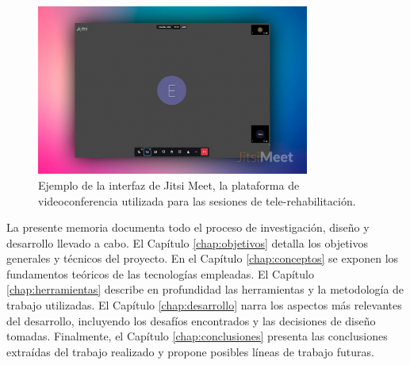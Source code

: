 \begin{figure}[H]
    \centering
    \includegraphics[width=0.8\textwidth]{img/interfazjitsi.jpg}
    \caption{Ejemplo de la interfaz de Jitsi Meet, la plataforma de videoconferencia utilizada para las sesiones de tele-rehabilitación.}
    \label{fig:interfaz_jitsi}
\end{figure}

La presente memoria documenta todo el proceso de investigación, diseño y desarrollo llevado a cabo. El Capítulo \ref{chap:objetivos} detalla los objetivos generales y técnicos del proyecto. En el Capítulo \ref{chap:conceptos} se exponen los fundamentos teóricos de las tecnologías empleadas. El Capítulo \ref{chap:herramientas} describe en profundidad las herramientas y la metodología de trabajo utilizadas. El Capítulo \ref{chap:desarrollo} narra los aspectos más relevantes del desarrollo, incluyendo los desafíos encontrados y las decisiones de diseño tomadas. Finalmente, el Capítulo \ref{chap:conclusiones} presenta las conclusiones extraídas del trabajo realizado y propone posibles líneas de trabajo futuras.
